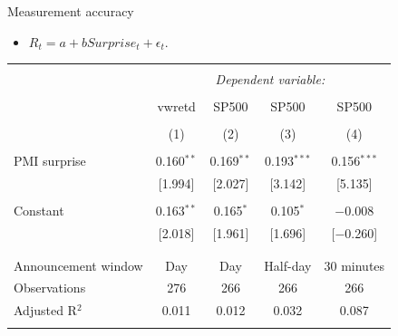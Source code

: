 \documentclass{beamer}
\begin{document}
\begin{frame}{Measurement accuracy}
\begin{itemize}
    \item {$R_t = a + b Surprise_t + \epsilon_t.$}
\end{itemize}
\begin{table}[!htbp] \centering 
{\renewcommand{\arraystretch}{0.9}
\begin{tabular}{@{\extracolsep{2pt}}lcccc} 
\\[-1.8ex]\hline 
\hline \\[-1.8ex] 
 & \multicolumn{4}{c}{\textit{Dependent variable:}} \\ 
\cline{2-5} 
\\[-1.8ex] & vwretd & SP500 & SP500 & SP500 \\ 
\\[-1.8ex] & (1) & (2) & (3) & (4)\\ 
\hline \\[-1.8ex] 
 PMI surprise & 0.160$^{**}$ & 0.169$^{**}$ & 0.193$^{***}$ & 0.156$^{***}$ \\ 
  & [1.994] & [2.027] & [3.142] & [5.135] \\ 
  & & & & \\ 
 Constant & 0.163$^{**}$ & 0.165$^{*}$ & 0.105$^{*}$ & $-$0.008 \\ 
  & [2.018] & [1.961] & [1.696] & [$-$0.260] \\ 
  & & & & \\ 
\hline \\[-1.8ex] 
Announcement window & Day & Day & Half-day & 30 minutes \\ 
Observations & 276 & 266 & 266 & 266 \\ 
Adjusted R$^{2}$ & 0.011 & 0.012 & 0.032 & 0.087 \\ 
\hline 
\hline \\[-1.8ex] 
\end{tabular}}
\end{table}
\end{frame}
\end{document}
